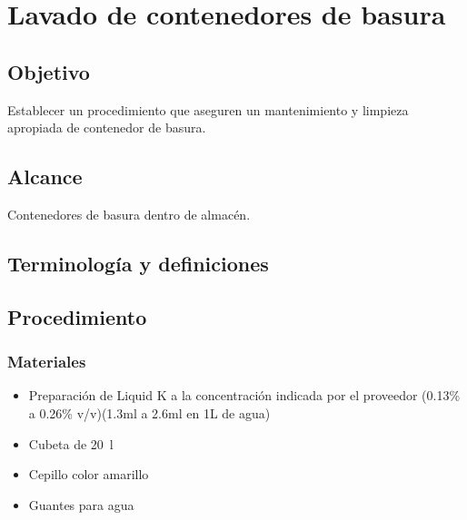\renewcommand{\MenorVer}{0}
\renewcommand{\MayorVer}{2}
\renewcommand{\Codigo}{HYS-15-IT}
\renewcommand{\FechaPub}{2023--01}
\renewcommand{\Titulo}{Lavado de contenedores de basura}

\section{\Titulo}

\subsection{Objetivo}

Establecer un procedimiento que aseguren un mantenimiento y limpieza apropiada de contenedor de basura.

\subsection{Alcance}

Contenedores de basura dentro de almacén.

\subsection{Terminología y definiciones}

\begin{description}
\end{description}



\subsection{Procedimiento}

\subsubsection{Materiales}

\begin{itemize}
	\item Preparación de Liquid K a la concentración indicada por el proveedor (0.13\% a 0.26\% v/v)(1.3ml a 2.6ml en 1L de agua)
	\item Cubeta de \qty{20}{\litre}
	\item Cepillo color amarillo
	\item Guantes para agua
\end{itemize}

